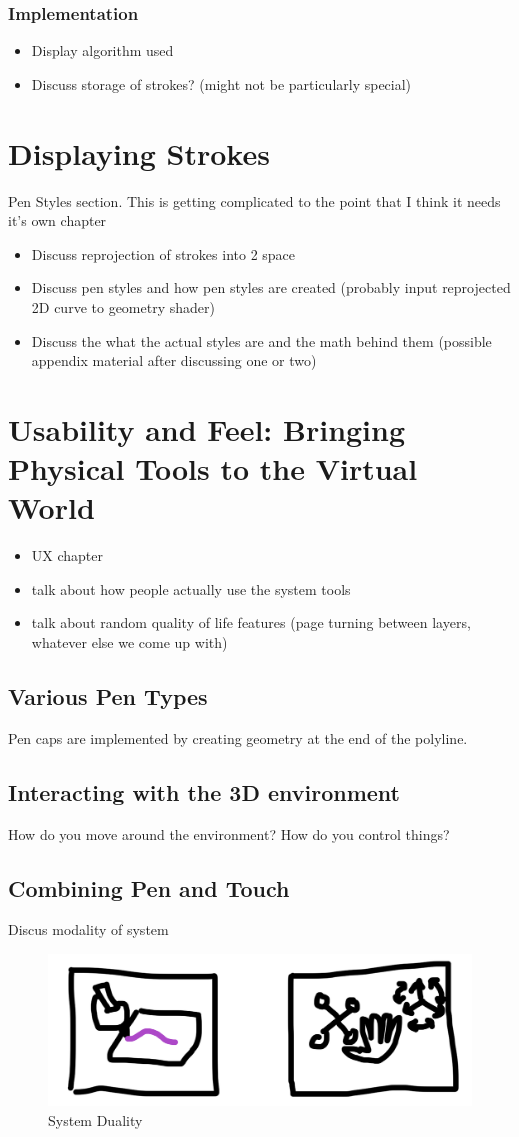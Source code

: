 \documentclass[12pt]{report}
\begin{document}
\subsection{Implementation}
\begin{itemize}
\item Display algorithm used
\item Discuss storage of strokes? (might not be particularly special)
\end{itemize}

\pagebreak
\chapter{Displaying Strokes}
Pen Styles section. This is getting complicated to the point that I think it needs it's own chapter
\begin{itemize}
\item Discuss reprojection of strokes into 2 space
\item Discuss pen styles and how pen styles are created (probably input reprojected 2D curve to geometry shader)
\item Discuss the what the actual styles are and the math behind them (possible appendix material after discussing one or two)
\end{itemize}
\pagebreak
\chapter{Usability and Feel: Bringing Physical Tools to the Virtual World}
\begin{itemize}
\item UX chapter
\item talk about how people actually use the system tools
\item talk about random quality of life features (page turning between layers, whatever else we come up with)
\end{itemize}
\section{Various Pen Types}
Pen caps are implemented by creating geometry at the end of the polyline.
\section{Interacting with the 3D environment}
How do you move around the environment? How do you control things?
\section{Combining Pen and Touch}
Discus modality of system
\begin{figure}[h]
\includegraphics[width=0.9\linewidth]{Duality}
\caption{System Duality}
\end{figure}
\end{document}
